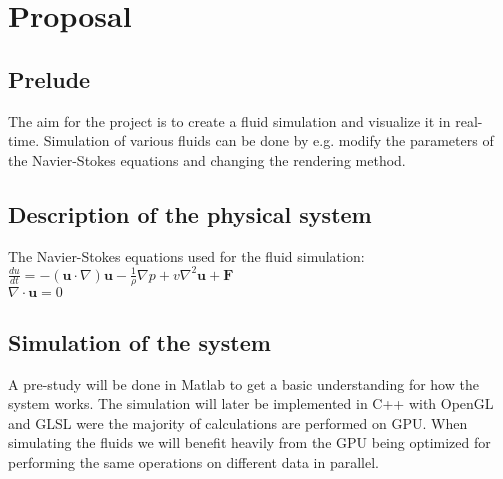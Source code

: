 \documentclass[a4paper,12pt,twoside,swedish]{report}
\begin{document}
\pagestyle{plain}

\setcounter{page}{1}

\chapter{Proposal}

\section{Prelude}
The aim for the project is to create a fluid simulation and visualize it in real-time. Simulation of various fluids can be done by e.g. modify the parameters of the Navier-Stokes equations and changing the rendering method.

\section{Description of the physical system}
The Navier-Stokes equations used for the fluid simulation:\\
\(\frac{du}{dt} = - (\textbf{u}\cdot{\nabla})\textbf{u} - \frac{1}{\rho}\nabla p + v \nabla^2 \textbf{u} + \textbf{F}\) \\
\(\nabla \cdot \textbf{u} = 0 \)

\section{Simulation of the system}
A pre-study will be done in Matlab to get a basic understanding for how the system works. The simulation will later be implemented in C++ with OpenGL and GLSL were the majority of calculations are performed on GPU. When simulating the fluids we will benefit heavily from the GPU being optimized for performing the same operations on different data in parallel.
\end{document}
